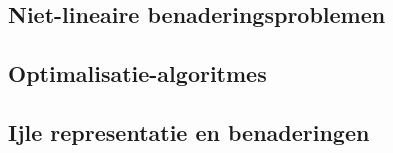 \documentclass{exam} %
\begin{document}
\newpage

\subsection{Niet-lineaire benaderingsproblemen}

\vspace{0.5cm}




\subsection{Optimalisatie-algoritmes}

\vspace{0.5cm}




\subsection{Ijle representatie en benaderingen}

\vspace{0.5cm}



\end{document}
